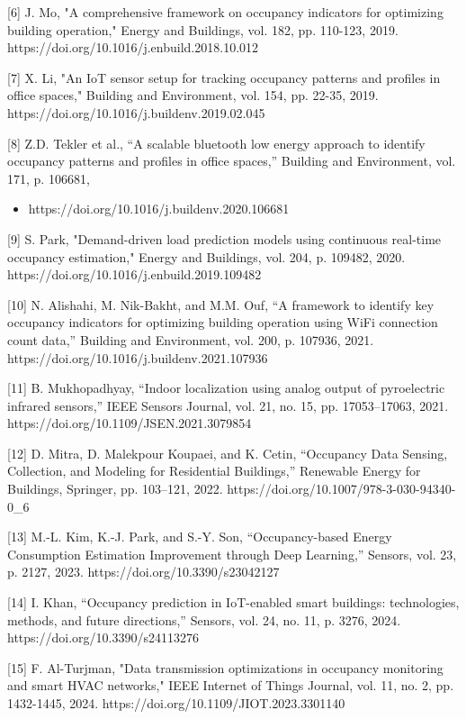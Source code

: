 [6] J. Mo, "A comprehensive framework on occupancy indicators for optimizing building
operation," Energy and Buildings, vol. 182, pp. 110-123, 2019.
https://doi.org/10.1016/j.enbuild.2018.10.012

[7] X. Li, "An IoT sensor setup for tracking occupancy patterns and profiles in office
spaces," Building and Environment, vol. 154, pp. 22-35, 2019.
https://doi.org/10.1016/j.buildenv.2019.02.045

[8] Z.D. Tekler et al., ``A scalable bluetooth low energy approach to identify occupancy
patterns and profiles in office spaces,'' Building and Environment, vol. 171, p. 106681,
\begin{itemize}
  \item https://doi.org/10.1016/j.buildenv.2020.106681
\end{itemize}

[9] S. Park, "Demand-driven load prediction models using continuous real-time
occupancy estimation," Energy and Buildings, vol. 204, p. 109482, 2020.
https://doi.org/10.1016/j.enbuild.2019.109482

[10] N. Alishahi, M. Nik-Bakht, and M.M. Ouf, ``A framework to identify key occupancy
indicators for optimizing building operation using WiFi connection count data,'' Building
and Environment, vol. 200, p. 107936, 2021. https://doi.org/10.1016/j.buildenv.2021.107936



[11] B. Mukhopadhyay, ``Indoor localization using analog output of pyroelectric infrared
sensors,'' IEEE Sensors Journal, vol. 21, no. 15, pp. 17053--17063, 2021.
https://doi.org/10.1109/JSEN.2021.3079854

[12] D. Mitra, D. Malekpour Koupaei, and K. Cetin, ``Occupancy Data Sensing, Collection,
and Modeling for Residential Buildings,'' Renewable Energy for Buildings, Springer, pp.
103--121, 2022. https://doi.org/10.1007/978-3-030-94340-0_6

[13] M.-L. Kim, K.-J. Park, and S.-Y. Son, ``Occupancy-based Energy Consumption
Estimation Improvement through Deep Learning,'' Sensors, vol. 23, p. 2127, 2023.
https://doi.org/10.3390/s23042127

[14] I. Khan, ``Occupancy prediction in IoT-enabled smart buildings: technologies,
methods, and future directions,'' Sensors, vol. 24, no. 11, p. 3276, 2024.
https://doi.org/10.3390/s24113276

[15] F. Al-Turjman, "Data transmission optimizations in occupancy monitoring and smart
HVAC networks," IEEE Internet of Things Journal, vol. 11, no. 2, pp. 1432-1445, 2024.
https://doi.org/10.1109/JIOT.2023.3301140


